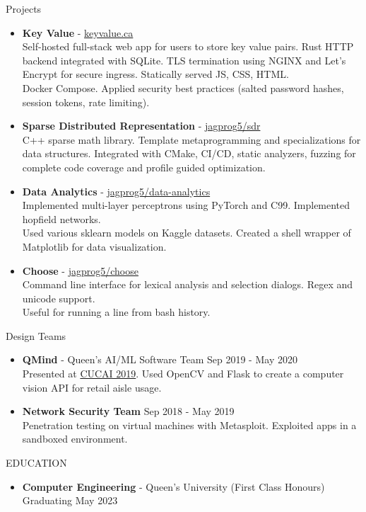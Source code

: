 \documentclass{resume} %
\begin{document}
\begin{rSection}{Projects}
    \begin{itemize}
        \item {\bf Key Value} - \href{http://www.keyvalue.ca/}{keyvalue.ca}\\
        Self-hosted full-stack web app for users to store key value pairs. Rust HTTP backend integrated with SQLite. TLS termination using NGINX and Let's Encrypt for secure ingress. Statically served JS, CSS, HTML.\\
        Docker Compose. Applied security best practices (salted password hashes, session tokens, rate limiting).
        \item {\bf Sparse Distributed Representation} - \href{https://github.com/jagprog5/SDR/}{jagprog5/sdr}\\
        C++ sparse math library. Template metaprogramming and specializations for data structures. Integrated with CMake, CI/CD, static analyzers, fuzzing for complete code coverage and profile guided optimization.
        \item {\bf Data Analytics} - \href{https://github.com/jagprog5/resume/blob/main/data-analytics-projects.md}{jagprog5/data-analytics}\\
        Implemented multi-layer perceptrons using PyTorch and C99. Implemented hopfield networks.\\
        Used various sklearn models on Kaggle datasets. Created a shell wrapper of Matplotlib for data visualization. 
        \item {\bf Choose} - \href{https://github.com/jagprog5/choose/}{jagprog5/choose}\\
        Command line interface for lexical analysis and selection dialogs. Regex and unicode support.\\
        Useful for running a line from bash history.
    \end{itemize}
\end{rSection}

\begin{rSection}{Design Teams}
    \begin{itemize}
        \item {\bf QMind} - Queen's AI/ML Software Team \hfill {Sep 2019 - May 2020}\\
        Presented at \href{https://medium.com/qmind-ai/cucai2019-c9d5f848f5c}{CUCAI 2019}. Used OpenCV and Flask to create a computer vision API for retail aisle usage.
        \item {\bf Network Security Team} \hfill {Sep 2018 - May 2019}\\
        Penetration testing on virtual machines with Metasploit. Exploited apps in a sandboxed environment.
\end{itemize}
\end{rSection}

\begin{rSection}{EDUCATION}
    \begin{itemize}
        \item {\bf Computer Engineering} - Queen's University (First Class Honours) \hfill {Graduating May 2023}
    \end{itemize}
\end{rSection}
\end{document}
